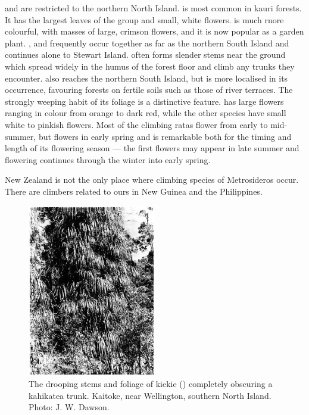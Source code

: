  and  are restricted to the northern North Island.  is most common in kauri forests.
It has the largest leaves of the group and small, white flowers.  is much rnore colourful, with masses of large, crimson flowers, and it is now popular as a garden plant. ,  and  frequently occur together as far as the northern South Island and  continues alone to Stewart Island.  often forms slender stems near the ground which spread widely in the humus of the forest floor and climb any trunks they encounter.  also reaches the northern South Island, but is more localised in its occurrence, favouring forests on fertile soils such as those of river terraces.
The strongly weeping habit of its foliage is a distinctive feature.  has large flowers ranging in colour from orange to dark red, while the other species have small white to pinkish flowers.
Most of the climbing ratas flower from early to mid-summer, but  flowers in early spring and  is remarkable both for the timing and length of its flowering season --- the first flowers may appear in late summer and flowering continues through the winter into early spring.

New Zealand is not the only place where climbing species of Metrosideros occur.
There are climbers related to ours in New Guinea and the Philippines.

\begin{figure}
	\includegraphics[width=0.5\textwidth]{graphics/figure32kiekie.jpg}
	\centering
	\caption[The drooping stems and foliage of kiekie]{The drooping stems and foliage of kiekie () completely obscuring a kahikatea trunk. Kaitoke, near Wellington, southern North Island. Photo: J. W. Dawson.}%
	\label{fig:32kiekie}
\end{figure}

